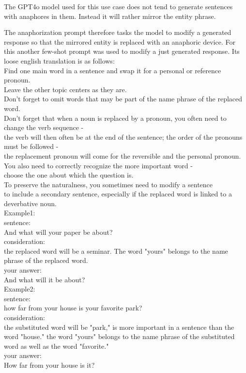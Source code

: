 \documentclass[12pt]{report}
\begin{document}
{The GPT4o model used for this use case
does not tend to generate sentences with anaphores in them.
Instead it will rather mirror the entity phrase.

The anaphorization prompt therefore tasks the model
to modify a generated response so
that the mirrored entity is replaced with
an anaphoric device.
For this another few-shot prompt was used to modify a just generated response.
Its loose english translation is as follows:\\

\linespread{1.5}
{\tiny
Find one main word in a sentence and swap it for a personal or reference pronoun.\\
 Leave the other topic centers as they are.\\
 Don't forget to omit words that may be part of the name phrase of the replaced word.\\
 Don't forget that when a noun is replaced by a pronoun, you often need to change the verb sequence -\\
 the verb will then often be at the end of the sentence; the order of the pronouns must be followed -\\
 the replacement pronoun will come for the reversible and the personal pronoun. You also need to correctly recognize the more important word -\\
 choose the one about which the question is.\\
 To preserve the naturalness, you sometimes need to modify a sentence\\
 to include a secondary sentence, especially if the replaced word is linked to a deverbative noun.\\

 Example1:\\
 sentence:\\
 And what will your paper be about?\\
 consideration:\\
 the replaced word will be a seminar. The word "yours" belongs to the name phrase of the replaced word.\\
 your answer:\\
 And what will it be about?\\

 Example2:\\
 sentence:\\
 how far from your house is your favorite park?\\
 consideration:\\
 the substituted word will be "park," is more important in a sentence than the word "house." the word "yours" belongs to the name phrase of the substituted word as well as the word "favorite."\\
 your answer:\\
 How far from your house is it?\\

}}
\end{document}
